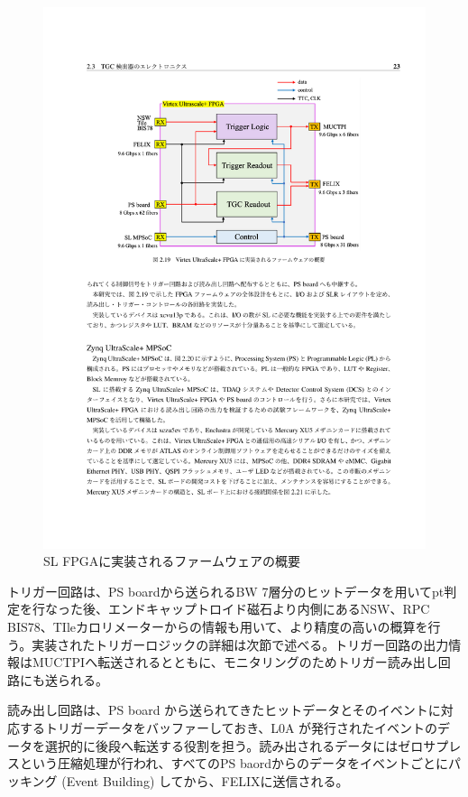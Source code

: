 \begin{figure} 
\centering
\includegraphics[width=16cm]{fig/Intro/SL_FW_overview.pdf}
\caption[SL FPGAに実装されるファームウェアの概要]{SL FPGAに実装されるファームウェアの概要\cite{}}
\label{fig_CTA}
\end{figure}

トリガー回路は、PS boardから送られるBW 7層分のヒットデータを用いてpt判定を行なった後、エンドキャップトロイド磁石より内側にあるNSW、RPC BIS78、TIleカロリメーターからの情報も用いて、より精度の高い\pt の概算を行う。実装されたトリガーロジックの詳細は次節で述べる。トリガー回路の出力情報はMUCTPIへ転送されるとともに、モニタリングのためトリガー読み出し回路にも送られる。

読み出し回路は、PS board から送られてきたヒットデータとそのイベントに対応するトリガーデータをバッファーしておき、L0A が発行されたイベントのデータを選択的に後段へ転送する役割を担う。読み出されるデータにはゼロサプレスという圧縮処理が行われ、すべてのPS baordからのデータをイベントごとにパッキング (Event Building) してから、FELIXに送信される。


